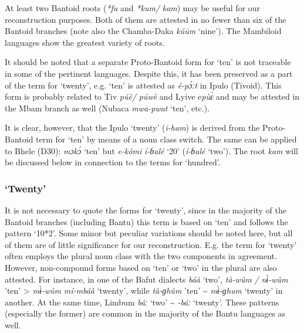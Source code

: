 At least two Bantoid roots (\textit{*fu} and \textit{*kum/} \textit{kam}) may be useful for our reconstruction purposes. Both of them are attested in no fewer than six of the Bantoid branches (note also the Chamba-Daka \textit{kú{\={u}}m} `nine'). The Mambiloid languages show the greatest variety of roots.

It should be noted that a separate Proto-Bantoid form for `ten' is not traceable in some of the pertinent languages. Despite this, it has been preserved as a part of the term for `twenty', e.g. `ten' is attested as \textit{é-p{\'{ɔ}}ːt} in Ipulo (Tivoid). This form is probably related to Tiv \textit{púè/} \textit{púwè} and Lyive e\textit{pù{\`{ɛ}}} and may be attested in the Mbam branch as well (Nubaca \textit{mwa-pwat} ‘ten’, etc.).

It is clear, however, that the Ipulo `twenty' (\textit{i-ham}) is derived from the Proto-Bantoid term for `ten' by means of a noun class switch. The same can be applied to Bhele (D30): \textit{mɔk{\'{ɔ}}} ‘ten’ but \textit{e-kómi} \textit{í-ɓalé} ‘20’ (\textit{í-ɓalé} ‘two’). The root \textit{kam} will be discussed below in connection to the terms for `hundred'. 

\newpage  
\subsubsection{‘Twenty’}\label{sec:3.1.1.9}
It is not necessary to quote the forms for `twenty', since in the majority of the Bantoid branches (including Bantu) this term is based on `ten' and follows the pattern ‘10*2’. Some minor but peculiar variations should be noted here, but all of them are of little significance for our reconstruction. E.g. the term for `twenty' often employs the plural noun class with the two components in agreement. However, non-compound forms based on `ten' or `two' in the plural are also attested. For instance, in one of the Bafut dialects \textit{báà} ‘two’, \textit{tà-w{\^{u}}m} \textit{/} \textit{n{\`{ɨ}}-w{\^{u}}m} ’ten’ > \textit{m{\`{ɨ}}-wúm} \textit{mí-mbáà} ‘twenty’, while \textit{tà-ɡh{\^{u}}m} ’ten’ {\textasciitilde} \textit{m{\`{ɨ}}-ɡhum} ‘twenty’ in another. At the same time, Limbum \textit{báː} ‘two’ {\textasciitilde} \textit{{}-báː} ‘twenty’. These patterns (especially the former) are common in the majority of the Bantu languages as well. 

